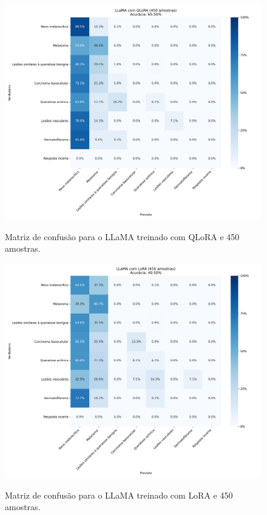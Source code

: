 \begin{figure}[ht]
    \centering
    \caption{\small Matriz de confusão para o \ac{LLaMA} treinado com \ac{QLoRA} e 450 amostras.}
    \includegraphics[width=1\columnwidth,keepaspectratio]{images/confusion_matrix_qlora_450.png}
    \label{fig:confusion_matrix_qlora_450}
\end{figure}

\clearpage

\begin{figure}[ht]
    \centering
    \caption{\small Matriz de confusão para o \ac{LLaMA} treinado com \ac{LoRA} e 450 amostras.}
    \includegraphics[width=1\columnwidth,keepaspectratio]{images/confusion_matrix_lora_450.png}
    \label{fig:confusion_matrix_lora_450}
\end{figure}

